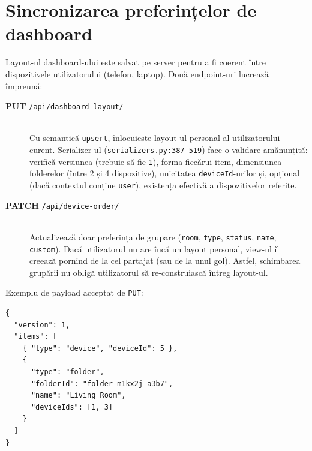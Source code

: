 \section{Sincronizarea preferințelor de dashboard}
Layout-ul dashboard-ului este salvat pe server pentru a fi coerent între dispozitivele utilizatorului (telefon, laptop). Două endpoint-uri lucrează împreună:
\begin{description}
    \item[\textbf{PUT} \texttt{/api/dashboard-layout/}] \hfill \\
    Cu semantică \texttt{upsert}, înlocuiește layout-ul personal al utilizatorului curent. Serializer-ul (\texttt{serializers.py:387-519}) face o validare amănunțită: verifică versiunea (trebuie să fie \texttt{1}), forma fiecărui item, dimensiunea folderelor (între 2 și 4 dispozitive), unicitatea \texttt{deviceId}-urilor și, opțional (dacă contextul conține \texttt{user}), existența efectivă a dispozitivelor referite.
    \item[\textbf{PATCH} \texttt{/api/device-order/}] \hfill \\
    Actualizează doar preferința de grupare (\texttt{room}, \texttt{type}, \texttt{status}, \texttt{name}, \texttt{custom}). Dacă utilizatorul nu are încă un layout personal, view-ul îl creează pornind de la cel partajat (sau de la unul gol). Astfel, schimbarea grupării nu obligă utilizatorul să re-construiască întreg layout-ul.
\end{description}
Exemplu de payload acceptat de \texttt{PUT}:
\begin{verbatim}
{
  "version": 1,
  "items": [
    { "type": "device", "deviceId": 5 },
    {
      "type": "folder",
      "folderId": "folder-m1kx2j-a3b7",
      "name": "Living Room",
      "deviceIds": [1, 3]
    }
  ]
}
\end{verbatim}
